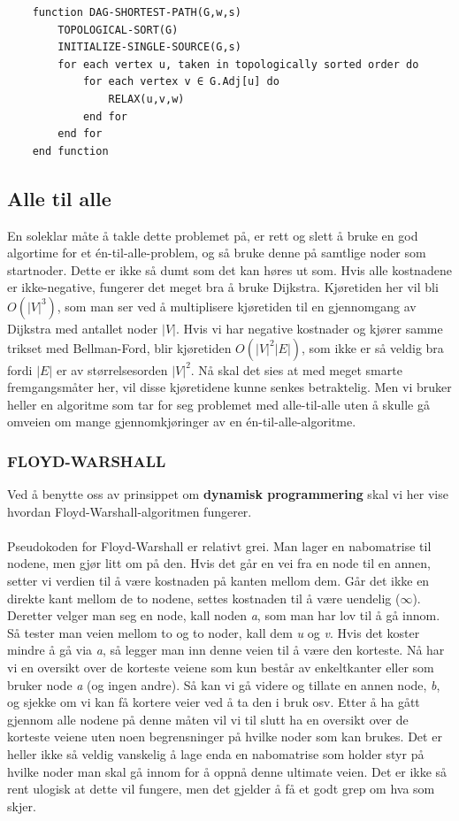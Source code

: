 \begin{lstlisting}
    function DAG-SHORTEST-PATH(G,w,s)
    	TOPOLOGICAL-SORT(G)
    	INITIALIZE-SINGLE-SOURCE(G,s)
    	for each vertex u, taken in topologically sorted order do
    		for each vertex v ∈ G.Adj[u] do
    			RELAX(u,v,w)
    		end for
    	end for
    end function

\end{lstlisting}

\subsection{Alle til alle}
En soleklar måte å takle dette problemet på, er rett og slett å bruke en god algortime for et én-til-alle-problem, og så bruke denne på samtlige noder som startnoder. Dette er ikke så dumt som det kan høres ut som. Hvis alle kostnadene er ikke-negative, fungerer det meget bra å bruke Dijkstra. Kjøretiden her vil bli $O(|V|^3)$, som man ser ved å multiplisere kjøretiden til en gjennomgang av Dijkstra med antallet noder $|V|$. Hvis vi har negative kostnader og kjører samme trikset med Bellman-Ford, blir kjøretiden $O(|V|^2 |E|)$, som ikke er så veldig bra fordi $|E|$ er av størrelsesorden $|V|^2$. Nå skal det sies at med meget smarte fremgangsmåter her, vil disse kjøretidene kunne senkes betraktelig. Men vi bruker heller en algoritme som tar for seg problemet med alle-til-alle uten å skulle gå omveien om mange gjennomkjøringer av en én-til-alle-algoritme.

\subsubsection{FLOYD-WARSHALL}
Ved å benytte oss av prinsippet om \textbf{dynamisk programmering} skal vi her vise hvordan Floyd-Warshall-algoritmen fungerer.
\\\\
Pseudokoden for Floyd-Warshall er relativt grei. Man lager en nabomatrise til nodene, men gjør litt om på den. Hvis det går en vei fra en node til en annen, setter vi verdien til å være kostnaden på kanten mellom dem. Går det ikke en direkte kant mellom de to nodene, settes kostnaden til å være uendelig ($\infty$). Deretter velger man seg en node, kall noden \textit{a}, som man har lov til å gå innom. Så tester man veien mellom to og to noder, kall dem \textit{u} og \textit{v}. Hvis det koster mindre å gå via \textit{a}, så legger man inn denne veien til å være den korteste. Nå har vi en oversikt over de korteste veiene som kun består av enkeltkanter eller som bruker node \textit{a} (og ingen andre). Så kan vi gå videre og tillate en annen node, \textit{b}, og sjekke om vi kan få kortere veier ved å ta den i bruk osv. Etter å ha gått gjennom alle nodene på denne måten vil vi til slutt ha en oversikt over de korteste veiene uten noen begrensninger på hvilke noder som kan brukes. Det er heller ikke så veldig vanskelig å lage enda en nabomatrise som holder styr på hvilke noder man skal gå innom for å oppnå denne ultimate veien. Det er ikke så rent ulogisk at dette vil fungere, men det gjelder å få et godt grep om hva som skjer.


